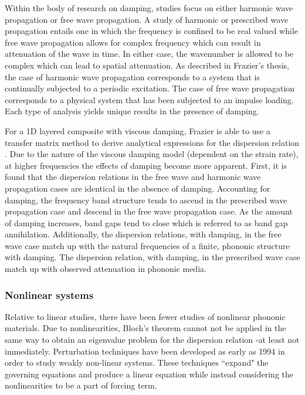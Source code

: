 \documentclass{article}
\begin{document}
Within the body of research on damping, studies focus on either harmonic wave 
propagation or free wave propagation. A study of harmonic or prescribed wave 
propagation entails one in which the frequency is confined to be real valued 
while free wave propagation allows for complex frequency which can result in 
attenuation of the wave in time. In either case, the wavenumber is allowed 
to be complex which can lead to spatial attenuation. As described in Frazier's 
thesis, the case of harmonic wave propagation corresponds to a system that is 
continually subjected to a periodic excitation. The case of free wave 
propagation corresponds to a physical system that has been subjected to an 
impulse loading. Each type of analysis yields unique results in the presence of 
damping. 

For a 1D layered composite with viscous damping, Frazier is able to use a 
transfer matrix method to derive analytical expressions for the dispersion 
relation \cite{frazier15}. Due to the nature of the viscous damping model 
(dependent on the strain rate), at higher frequencies the effects of damping 
become more apparent. First, it is found that the dispersion relations in the 
free wave and harmonic wave propagation cases are identical in the absence of 
damping. Accounting for damping, the frequency band structure tends to ascend 
in the prescribed wave propagation case and descend in the free wave 
propagation case. As the amount of damping increases, band gaps tend to close 
which is referred to as band gap annihilation. Additionally, the dispersion 
relations, with damping, in the free wave case match up with the natural 
frequencies of a finite, phononic structure with damping. The dispersion 
relation, with damping, in the prescribed wave case match up with observed 
attenuation in phononic media. 

\subsubsection{Nonlinear systems}
Relative to linear studies, there have been fewer studies of nonlinear phononic 
materials. Due to nonlinearities, Bloch's theorem cannot not be applied in the 
same way to obtain an eigenvalue problem for the dispersion relation -at least 
not immediately. Perturbation techniques have been developed as early as 1994 
in order to study weakly non-linear systems. These techniques ``expand" the 
governing equations and produce a linear equation while instead considering the 
nonlinearities to be a part of forcing term.
\end{document}
